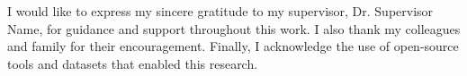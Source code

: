 I would like to express my sincere gratitude to my supervisor, Dr. Supervisor Name, for guidance and support throughout this work. I also thank my colleagues and family for their encouragement. Finally, I acknowledge the use of open-source tools and datasets that enabled this research.
